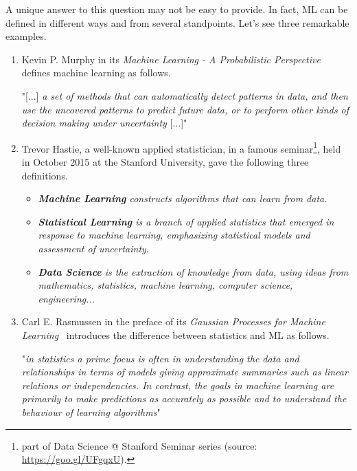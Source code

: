 A unique answer to this question may not be easy to provide. In fact, ML can be defined in different ways and from several standpoints. Let's see three remarkable examples.

\begin{enumerate}
  \item Kevin P. Murphy in its \emph{Machine Learning - A Probabilistic Perspective}~\cite{murphy2012machine} defines machine learning as follows.

  \begin{displayquote}
  "[...] \emph{a set of methods that can automatically detect patterns in data, and then use the uncovered patterns to predict future data, or to perform other kinds of decision making under uncertainty} [...]"
  \end{displayquote}

  \item Trevor Hastie, a well-known applied statistician, in a famous seminar\footnote{part of Data Science @ Stanford Seminar series (source: \url{https://goo.gl/UFgqxU}).}, held in October 2015 at the Stanford University, gave the following three definitions.

  \begin{displayquote}
    \begin{itemize}
      \item[] \emph{{\bf Machine Learning} constructs algorithms that can learn from data.}
      \item[] \emph{{\bf Statistical Learning}  is a branch of applied statistics that emerged in response to machine learning, emphasizing statistical models and assessment of uncertainty.}
      \item[] \emph{{\bf Data Science}  is the extraction of knowledge from data, using ideas from mathematics, statistics, machine learning, computer science, engineering...}
    \end{itemize}
  \end{displayquote}

  \item Carl E. Rasmussen in the preface of its \emph{Gaussian Processes for Machine Learning}~\cite{rasmussen2006gaussian} introduces the difference between statistics and ML as follows.

  \begin{displayquote}
    "\emph{in statistics a prime focus is often in understanding the data and relationships in terms of models giving approximate summaries such as linear relations or independencies. In contrast, the goals in machine learning are primarily to make predictions as accurately as possible and to understand the behaviour of learning algorithms}"
  \end{displayquote}

\end{enumerate}

